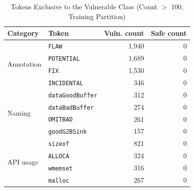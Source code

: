 \documentclass{ieeeaccess}
\begin{document}
\begin{table}[t]
\centering
\caption{Tokens Exclusive to the Vulnerable Class (Count $>$ 100, Training Partition)}
\label{tab:exclusive-tokens}
\begin{tabular}{@{}llrr@{}}
\toprule
\textbf{Category} & \textbf{Token} & \textbf{Vuln. count} & \textbf{Safe count} \\
\midrule
\multirow{4}{*}{Annotation}
 & \texttt{FLAW}          & 1{,}940 & 0 \\
 & \texttt{POTENTIAL}     & 1{,}689 & 0 \\
 & \texttt{FIX}           & 1{,}530 & 0 \\
 & \texttt{INCIDENTAL}    &   346 & 0 \\
\midrule
\multirow{4}{*}{Naming}
 & \texttt{dataGoodBuffer} & 312 & 0 \\
 & \texttt{dataBadBuffer}  & 274 & 0 \\
 & \texttt{OMITBAD}        & 261 & 0 \\
 & \texttt{goodG2BSink}    & 157 & 0 \\
\midrule
\multirow{4}{*}{API usage}
 & \texttt{sizeof}  & 821 & 0 \\
 & \texttt{ALLOCA}  & 324 & 0 \\
 & \texttt{wmemset} & 316 & 0 \\
 & \texttt{malloc}  & 267 & 0 \\
\bottomrule
\end{tabular}
\end{table}
\end{document}
